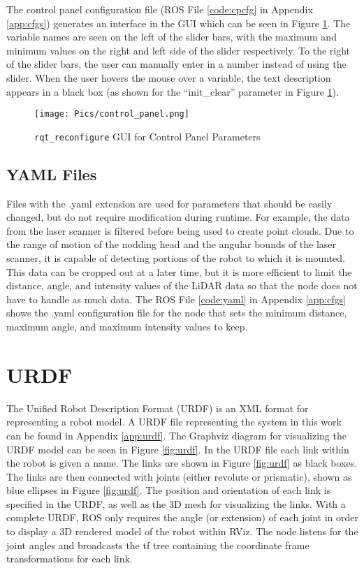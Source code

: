 The control panel configuration file (ROS File \ref{code:cpcfg} in Appendix \ref{app:cfgs}) generates an interface in the  GUI which can be seen in Figure \ref{fig:cpgui}. The variable names are seen on the left of the slider bars, with the maximum and minimum values on the right and left side of the slider respectively. To the right of the slider bars, the user can manually enter in a number instead of using the slider. When the user hovers the mouse over a variable, the text description appears in a black box (as shown for the ``init\_clear'' parameter in Figure \ref{fig:cpgui}).

\begin{figure}[h]
    \centering
    \texttt{[image: Pics/control\_panel.png]}
    \caption{\texttt{rqt\_reconfigure} GUI for Control Panel Parameters}
    \label{fig:cpgui}
\end{figure}

\subsection{YAML Files}
Files with the .yaml extension are used for parameters that should be easily changed, but do not require modification during runtime. For example, the data from the laser scanner is filtered before being used to create point clouds. Due to the range of motion of the nodding head and the angular bounds of the laser scanner, it is capable of detecting portions of the robot to which it is mounted. This data can be cropped out at a later time, but it is more efficient to limit the distance, angle, and intensity values of the LiDAR data so that the  node does not have to handle as much data. The ROS File \ref{code:yaml} in Appendix \ref{app:cfgs} shows the .yaml configuration file for the  node that sets the minimum distance, maximum angle, and maximum intensity values to keep.\\

\section{URDF}
The Unified Robot Description Format (URDF) is an XML format for representing a robot model. A URDF file representing the system in this work can be found in Appendix \ref{app:urdf}. The Graphviz diagram for visualizing the URDF model can be seen in Figure \ref{fig:urdf}. In the URDF file each link within the robot is given a name. The links are shown in Figure \ref{fig:urdf} as black boxes. The links are then connected with joints (either revolute or prismatic), shown as blue ellipses in Figure \ref{fig:urdf}. The position and orientation of each link is specified in the URDF, as well as the 3D mesh for visualizing the links. With a complete URDF, ROS only requires the angle (or extension) of each joint in order to display a 3D rendered model of the robot within RViz. The  node listens for the joint angles and broadcasts the tf tree containing the coordinate frame transformations for each link.\\

